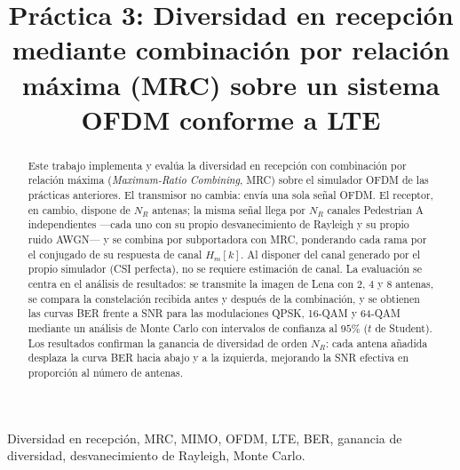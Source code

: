 \documentclass[conference,onecolumn]{IEEEtran}
\begin{document}
\title{Pr\'actica 3: Diversidad en recepci\'on mediante combinaci\'on por relaci\'on m\'axima (MRC) sobre un sistema OFDM conforme a LTE}

\author{
\and
{}
}

\maketitle

\begin{abstract}
Este trabajo implementa y eval\'ua la diversidad en recepci\'on con combinaci\'on por relaci\'on m\'axima (\textit{Maximum-Ratio Combining}, MRC) sobre el simulador OFDM de las pr\'acticas anteriores. El transmisor no cambia: env\'ia una sola se\~nal OFDM. El receptor, en cambio, dispone de $N_R$ antenas; la misma se\~nal llega por $N_R$ canales Pedestrian A independientes ---cada uno con su propio desvanecimiento de Rayleigh y su propio ruido AWGN--- y se combina por subportadora con MRC, ponderando cada rama por el conjugado de su respuesta de canal $H_m[k]$. Al disponer del canal generado por el propio simulador (CSI perfecta), no se requiere estimaci\'on de canal. La evaluaci\'on se centra en el an\'alisis de resultados: se transmite la imagen de Lena con $2$, $4$ y $8$ antenas, se compara la constelaci\'on recibida antes y despu\'es de la combinaci\'on, y se obtienen las curvas BER frente a SNR para las modulaciones QPSK, 16-QAM y 64-QAM mediante un an\'alisis de Monte Carlo con intervalos de confianza al $95\%$ ($t$ de Student). Los resultados confirman la ganancia de diversidad de orden $N_R$: cada antena a\~nadida desplaza la curva BER hacia abajo y a la izquierda, mejorando la SNR efectiva en proporci\'on al n\'umero de antenas.
\end{abstract}

\begin{IEEEkeywords}
Diversidad en recepci\'on, MRC, MIMO, OFDM, LTE, BER, ganancia de diversidad, desvanecimiento de Rayleigh, Monte Carlo.
\end{IEEEkeywords}
\end{document}
